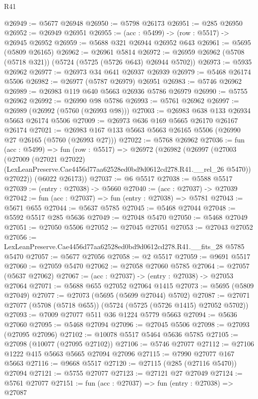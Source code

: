 \begin{lexlean}{R41}
\begin{coremodule}
@26949 := @5677 @26948
@26950 := @5798 @26173
@26951 := @285 @26950
@26952 := @26949 @26951
@26955 := (acc : @5499) -> (row : @5517) -> @26945 @26952
@26959 := @5688 @321 @26944 @26952 @643
@26961 := @5695 (@5809 @26165)
@26962 := @26961 @5814
@26972 := @26959 @26962 (@5708 (@5718 @321)) (@5724 (@5725 (@5726 @643) @26944 @5702))
@26973 := @5935 @26962
@26977 := @26973 @34 @641 @26937 @26939
@26979 := @5468 @26174 @5506
@26982 := @26977 (@5787 @26979) @26951
@26983 := @5746 @26962
@26989 := @26983 @119 @640 @5663 @26936 @5786 @26979
@26990 := @5755 @26962
@26992 := @26990 @98 @5786
@26993 := @5761 @26962
@26997 := @26989 (@26992 (@5760 (@26993 @98)))
@27003 := @26983 @638 @133 @26934 @5663 @26174 @5506
@27009 := @26973 @636 @169 @5665 @26170 @26167 @26174
@27021 := @26983 @167 @133 @5663 @5663 @26165 @5506 (@26990 @27 @26165 (@5760 (@26993 @27)))
@27022 := @5768 @26962
@27036 := fun (acc : @5499) =>
  fun (row : @5517) =>
  @26972
    (@26982
      (@26997
        (@27003
          (@27009
            (@27021 @27022)
            (LexLeanPreserve.Cae4456d77aa62528ed0bd9d0612cd278.R41.__rel_26 @5470))
          @27022))
      (@6022 @26173))
@27037 := @6 @5517
@27038 := @5588 @5517
@27039 := (entry : @27038) -> @5660
@27040 := (acc : @27037) -> @27039
@27042 := fun (acc : @27037) => fun (entry : @27038) => @5781
@27043 := @5671 @655
@27044 := @5637 @5785
@27045 := @5468 @27044
@27048 := @5592 @5517 @285 @5636
@27049 := @27048 @5470
@27050 := @5468 @27049
@27051 := @27050 @5506
@27052 := @27045 @27051
@27053 := @27043 @27052
@27056 := LexLeanPreserve.Cae4456d77aa62528ed0bd9d0612cd278.R41.__fits_28 @5785 @5470
@27057 := @5677 @27056
@27058 := @2 @5517
@27059 := @9691 @5517
@27060 := @27059 @5470
@27062 := @27058 @27060 @5785
@27064 := @27057 (@5637 @27062)
@27067 := (acc : @27037) -> (entry : @27038) -> @27053 @27064
@27071 := @5688 @655 @27052 @27064 @1415
@27073 := @5695 (@5809 @27049)
@27077 := @27073 (@5695 (@5699 @27044) @5702)
@27087 := @27071 @27077 (@5708 (@5718 @655)) (@5724 (@5725 (@5726 @1415) @27052 @5702))
@27093 := @7009 @27077 @511 @36 @1224 @5779 @5663
@27094 := @5636 @27060
@27095 := @5468 @27094
@27096 := @27045 @5506
@27098 := @27093 (@27095 @27096)
@27102 := @10078 @5517 @5464 @5636 @5785
@27105 := @27098 (@10077 (@27095 @27102))
@27106 := @5746 @27077
@27112 := @27106 @1222 @415 @5663 @5665 @27094 @27096
@27115 := @7990 @27077 @167 @5663
@27116 := @9668 @5517
@27120 := @27115 (@285 (@27116 @5470)) @27094
@27121 := @5755 @27077
@27123 := @27121 @27 @27049
@27124 := @5761 @27077
@27151 := fun (acc : @27037) =>
  fun (entry : @27038) =>
  @27087

\end{coremodule}
\end{lexlean}
